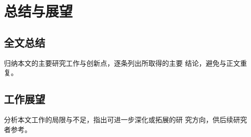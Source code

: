 %

\chapter{总结与展望}
\label{chap:conclusion}

\section{全文总结}
归纳本文的主要研究工作与创新点，逐条列出所取得的主要
结论，避免与正文重复。

\section{工作展望}
分析本文工作的局限与不足，指出可进一步深化或拓展的研
究方向，供后续研究者参考。

